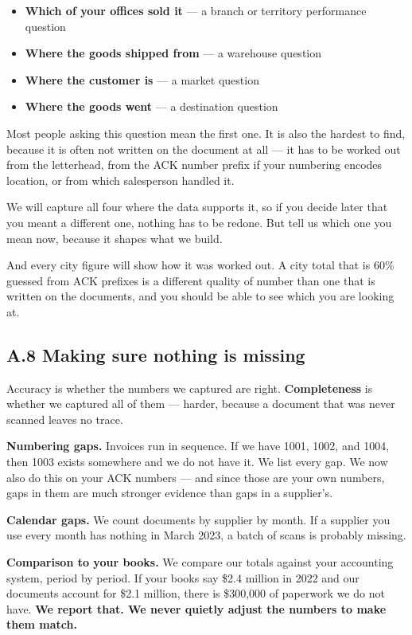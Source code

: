 \documentclass[
]{article}
\providecommand{\tightlist}{%
  \setlength{\itemsep}{0pt}\setlength{\parskip}{0pt}}
\begin{document}
\begin{itemize}
\tightlist
\item
  \textbf{Which of your offices sold it} --- a branch or territory
  performance question
\item
  \textbf{Where the goods shipped from} --- a warehouse question
\item
  \textbf{Where the customer is} --- a market question
\item
  \textbf{Where the goods went} --- a destination question
\end{itemize}

Most people asking this question mean the first one. It is also the
hardest to find, because it is often not written on the document at all
--- it has to be worked out from the letterhead, from the ACK number
prefix if your numbering encodes location, or from which salesperson
handled it.

We will capture all four where the data supports it, so if you decide
later that you meant a different one, nothing has to be redone. But tell
us which one you mean now, because it shapes what we build.

And every city figure will show how it was worked out. A city total that
is 60\% guessed from ACK prefixes is a different quality of number than
one that is written on the documents, and you should be able to see
which you are looking at.

\subsection{A.8 Making sure nothing is
missing}\label{a.8-making-sure-nothing-is-missing}

Accuracy is whether the numbers we captured are right.
\textbf{Completeness} is whether we captured all of them --- harder,
because a document that was never scanned leaves no trace.

\textbf{Numbering gaps.} Invoices run in sequence. If we have 1001,
1002, and 1004, then 1003 exists somewhere and we do not have it. We
list every gap. We now also do this on your ACK numbers --- and since
those are your own numbers, gaps in them are much stronger evidence than
gaps in a supplier's.

\textbf{Calendar gaps.} We count documents by supplier by month. If a
supplier you use every month has nothing in March 2023, a batch of scans
is probably missing.

\textbf{Comparison to your books.} We compare our totals against your
accounting system, period by period. If your books say \$2.4 million in
2022 and our documents account for \$2.1 million, there is \$300,000 of
paperwork we do not have. \textbf{We report that. We never quietly
adjust the numbers to make them match.}
\end{document}
